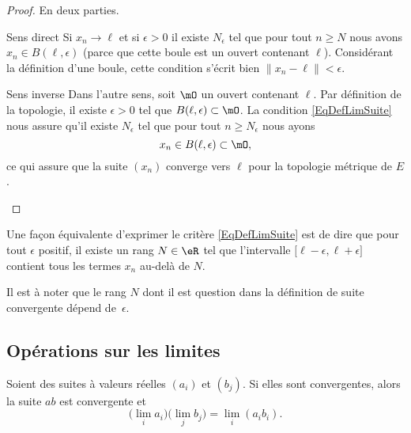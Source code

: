 \begin{proof}
	En deux parties.
	\begin{subproof}
		\item[Sens direct]
		Si \( x_n\to \ell\) et si \( \epsilon>0\) il existe \( N_{\epsilon}\) tel que pour tout \( n\geq N\) nous avons \( x_n\in B(\ell,\epsilon)\) (parce que cette boule est un ouvert contenant \( \ell\)). Considérant la définition d'une boule, cette condition s'écrit bien \( \| x_n-\ell \|<\epsilon\).

		\item[Sens inverse]
		Dans l'autre sens, soit \( \mO\) un ouvert contenant \( \ell\). Par définition de la topologie, il existe \( \epsilon>0\) tel que \( B(\ell,\epsilon)\subset \mO\). La condition \eqref{EqDefLimSuite} nous assure qu'il existe \( N_{\epsilon} \) tel que pour tout \( n\geq N_{\epsilon}\) nous ayons
		\begin{equation}
			x_n\in B(\ell,\epsilon)\subset\mO,
		\end{equation}
		ce qui assure que la suite \( (x_n)\) converge vers \( \ell\) pour la topologie métrique de \( E\).
	\end{subproof}
\end{proof}

Une façon équivalente d'exprimer le critère \eqref{EqDefLimSuite} est de dire que pour tout \( \epsilon\) positif, il existe un rang \( N\in\eR\) tel que l'intervalle \( \mathopen[ \ell-\epsilon , \ell+\epsilon \mathclose]\) contient tous les termes \( x_n\) au-delà de \( N\).

Il est à noter que le rang \( N\) dont il est question dans la définition de suite convergente dépend de~\( \epsilon\).

\subsection{Opérations sur les limites}

\begin{proposition}     \label{PROPooIQOAooJPMoDD}
	Soient des suites à valeurs réelles \( (a_i)\) et \( (b_j)\). Si elles sont convergentes, alors la suite \( ab\) est convergente et
	\begin{equation}
		\big( \lim_ia_i \big)\big( \lim_jb_j \big)=\lim_i(a_ib_i).
	\end{equation}
\end{proposition}

